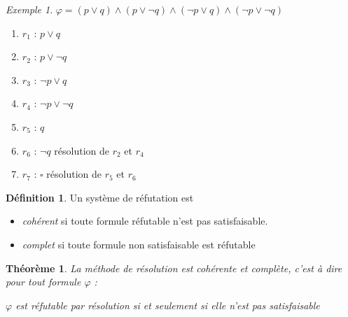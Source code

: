\documentclass[]{article}
\newtheorem{mythm}{Théorème}
\theoremstyle{remark}
\newtheorem{myexmpl}{Exemple}
\theoremstyle{definition}
\newtheorem{mydef}{Définition}
\begin{document}
\begin{myexmpl}
	$\varphi = (p \lor q) \land (p \lor \neg q) \land (\neg p \lor q) \land (\neg p \lor \neg q)$
	
	\begin{enumerate}
		\item $r_1$ : $p \lor q$
		\item $r_2$ : $p \lor \neg q$
		\item $r_3$ : $\neg p \lor q$
		\item $r_4$ : $\neg p \lor \neg q$
		\item $r_5$ : $q$
		\item $r_6$ : $\neg q$ résolution de $r_2$ et $r_4$
		\item $r_7$ : $\square$ résolution de $r_5$ et $r_6$
	\end{enumerate}
\end{myexmpl}

\begin{mydef}
	Un système de réfutation est
	\begin{itemize}
		\item \textit{cohérent} si toute formule réfutable n'est pas satisfaisable.
		
		\item \textit{complet} si toute formule non satisfaisable est réfutable
	\end{itemize}	
\end{mydef}

\begin{mythm}
	La méthode de résolution est cohérente et complète, c'est à dire pour tout formule $\varphi$ :
	
	$\varphi$ est réfutable par résolution si et seulement si elle n'est pas satisfaisable
\end{mythm}
\end{document}
